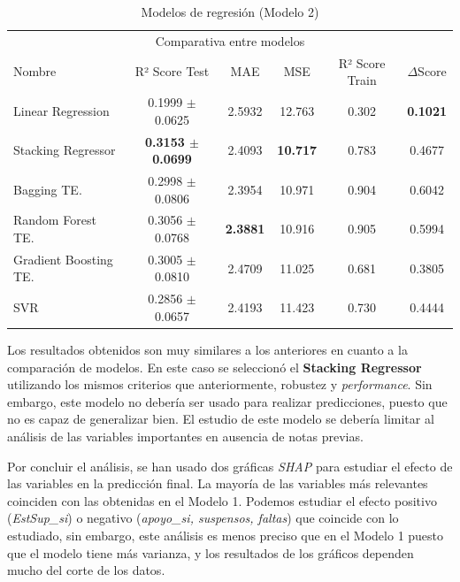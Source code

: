 \documentclass{article}
\begin{document}
\begin{table}[H]
  \caption{Modelos de regresión (Modelo 2)}
  \label{table-M2}
  \centering
  \begin{tabular}{lccccc}
    \toprule
    \multicolumn{6}{c}{Comparativa entre modelos} \\
    \cmidrule(r){1-6}
    Nombre & R² Score Test & MAE & MSE & R² Score Train & $\Delta$Score \\
    \midrule
    Linear Regression   & 0.1999 $\pm$ 0.0625 & 2.5932 & 12.763 & 0.302 & \textbf{0.1021}\\
    Stacking Regressor  & \textbf{0.3153 $\pm$ 0.0699} & 2.4093 & \textbf{10.717} & 0.783 & 0.4677 \\
    Bagging TE.         & 0.2998 $\pm$ 0.0806 & 2.3954 & 10.971 & 0.904 & 0.6042\\
    Random Forest TE.   & 0.3056 $\pm$ 0.0768 & \textbf{2.3881} & 10.916 & 0.905 & 0.5994\\
    Gradient Boosting TE.& 0.3005 $\pm$ 0.0810 & 2.4709 & 11.025 & 0.681 & 0.3805\\
    SVR                 & 0.2856 $\pm$ 0.0657 & 2.4193 & 11.423 & 0.730 & 0.4444\\
    \bottomrule
  \end{tabular}
\end{table}

Los resultados obtenidos son muy similares a los anteriores en cuanto a la comparación de modelos. En este caso se seleccionó el \textbf{Stacking Regressor} utilizando los mismos criterios que anteriormente, robustez y \textit{performance}.
Sin embargo, este modelo no debería ser usado para realizar predicciones, puesto que no es capaz de generalizar bien. El estudio de este modelo se debería limitar al análisis de las variables
importantes en ausencia de notas previas.

Por concluir el análisis, se han usado dos gráficas \textit{SHAP} para estudiar el efecto de las variables en la predicción final. La mayoría de las variables
más relevantes coinciden con las obtenidas en el Modelo 1. Podemos estudiar el efecto positivo (\textit{EstSup\_si}) o negativo (\textit{apoyo\_si, suspensos, faltas}) que coincide con lo estudiado, sin embargo, este
análisis es menos preciso que en el Modelo 1 puesto que el modelo tiene más varianza, y los resultados de los gráficos dependen mucho del corte de los datos.
\end{document}
